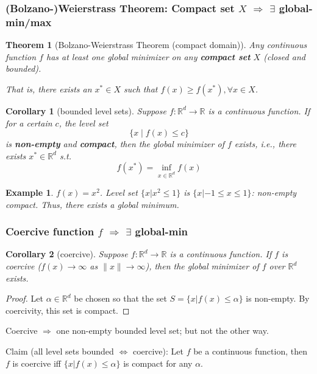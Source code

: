 \documentclass[11pt,a4paper]{article}
\newtheorem{theorem}{Theorem}
\newtheorem{example}{Example}
\newtheorem{corollary}{Corollary}
\begin{document}
\subsubsection{(Bolzano-)Weierstrass Theorem: Compact set $X$ $\Rightarrow$ $\exists$ global-min/max} 
\begin{theorem}[Bolzano-Weierstrass Theorem (compact domain)]
    Any continuous function $f$ has at least one global minimizer on any \textbf{compact set} $X$ (closed and bounded).

    That is, there exists an $x^{*} \in X$ such that $f(x) \geq f\left(x^{*}\right), \forall x \in X$.
\end{theorem}

\begin{corollary}[bounded level sets]
    Suppose $f: \mathbb{R}^{d} \rightarrow \mathbb{R}$ is a continuous function. If for a certain $c$, the level set
    $$
    \{x \mid f(x) \leq c\}
    $$
    is \textbf{non-empty} and \textbf{compact}, then the global minimizer of $f$ exists, i.e., there exists $x^{*} \in \mathbb{R}^{d}$ s.t.
    $$
    f\left(x^{*}\right)=\inf _{x \in \mathbb{R}^{d}} f(x)
    $$
\end{corollary}
\begin{example}
    $f(x) = x^2$.
    Level set $\{x|x^2 \leq 1\}$ is $\{x|-1\leq x\leq 1\}$: non-empty compact. Thus, there exists a global minimum.
\end{example}

\subsubsection{Coercive function $f$ $\Rightarrow$ $\exists$ global-min}
\begin{corollary}[coercive]
    Suppose $f: \mathbb{R}^{d} \rightarrow \mathbb{R}$ is a continuous function. If $f$ is coercive ($f(x) \rightarrow \infty$ as $\|x\| \rightarrow \infty$), then the global minimizer of $f$ over $\mathbb{R}^{d}$ exists.
\end{corollary}
\begin{proof}
Let $\alpha\in \mathbb{R}^d$ be chosen so that the set $S = \{x |f(x) \leq \alpha\}$ is non-empty. By coercivity,
this set is compact.
\end{proof}
Coercive $\Rightarrow$ one non-empty bounded level set; but not the other way.

Claim (all level sets bounded $\Leftrightarrow$ coercive): Let $f$ be a continuous function, then $f$ is coercive iff $\{x | f(x) \leq \alpha\}$ is compact for any $\alpha$.
\end{document}
